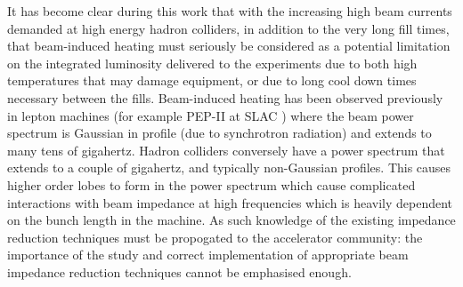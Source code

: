 It has become clear during this work that with the increasing high beam currents demanded at high energy hadron colliders, in addition to the very long fill times, that beam-induced heating must seriously be considered as a potential limitation on the integrated luminosity delivered to the experiments due to both high temperatures that may damage equipment, or due to long cool down times necessary between the fills. Beam-induced heating has been observed previously in lepton machines (for example PEP-II at SLAC \cite{Pivi:PEP}) where the beam power spectrum is Gaussian in profile (due to synchrotron radiation) and extends to many tens of gigahertz. Hadron colliders conversely have a power spectrum that extends to a couple of gigahertz, and typically non-Gaussian profiles. This causes higher order lobes to form in the power spectrum which cause complicated interactions with beam impedance at high frequencies which is heavily dependent on the bunch length in the machine. As such knowledge of the existing impedance reduction techniques must be propogated to the accelerator community: the importance of the study and correct implementation of appropriate beam impedance reduction techniques cannot be emphasised enough.